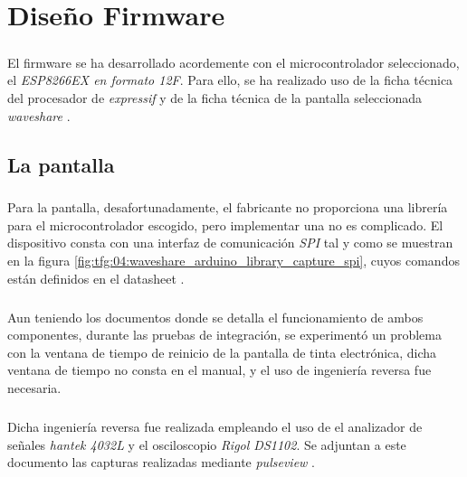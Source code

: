 \chapter{Diseño Firmware}
\label{diseño_firmware}


\paragraph{} El firmware se ha desarrollado acordemente con el microcontrolador seleccionado, el \textit{ESP8266EX en formato 12F}. Para ello, se ha realizado uso de la ficha técnica del procesador de \textit{expressif} \cite{esp-datasheet} y de la ficha técnica de la pantalla seleccionada \textit{waveshare} \cite{waveshare-datasheet}.

\section{La pantalla}

\paragraph{} Para la pantalla, desafortunadamente, el fabricante no proporciona una librería para el microcontrolador escogido, pero implementar una no es complicado. El dispositivo consta con una interfaz de comunicación \textit{SPI} \cite{motorola-spi} tal y como se muestran en la figura \ref{fig:tfg:04:waveshare_arduino_library_capture_spi}, cuyos comandos están definidos en el datasheet \cite{waveshare-datasheet}.

\paragraph{} Aun teniendo los documentos donde se detalla el funcionamiento de ambos componentes, durante las pruebas de integración, se experimentó un problema con la ventana de tiempo de reinicio de la pantalla de tinta electrónica, dicha ventana de tiempo no consta en el manual, y el uso de ingeniería reversa fue necesaria.

\paragraph{} Dicha ingeniería reversa fue realizada empleando el uso de el analizador de señales \textit{hantek 4032L} y el osciloscopio \textit{Rigol DS1102}. Se adjuntan a este documento las capturas realizadas mediante \textit{pulseview} \cite{pulseview}.

